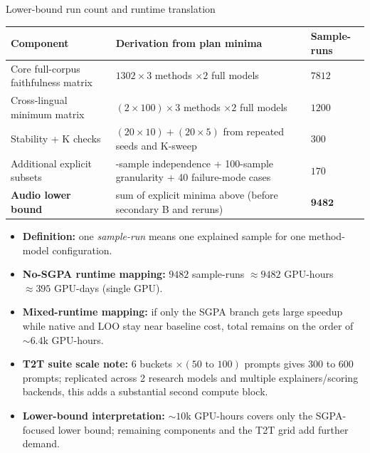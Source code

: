 \documentclass[aspectratio=169]{beamer}
\begin{document}
\begin{frame}{Lower-bound run count and runtime translation}
  \scriptsize
  \begin{tabularx}{\textwidth}{>{\raggedright\arraybackslash}p{3.0cm} >{\raggedright\arraybackslash}X >{\raggedright\arraybackslash}p{2.0cm}}
    \toprule
    \textbf{Component} & \textbf{Derivation from plan minima} & \textbf{Sample-runs} \\
    \midrule
    Core full-corpus faithfulness matrix & \(1302 \times 3\) methods \(\times 2\) full models & \(7812\) \\
    Cross-lingual minimum matrix & \((2 \times 100)\times 3\) methods \(\times 2\) full models & \(1200\) \\
    Stability + K checks & \((20\times10) + (20\times5)\) from repeated seeds and K-sweep & \(300\) \\
    Additional explicit subsets & 30-sample independence + 100-sample granularity + 40 failure-mode cases & \(170\) \\
    \midrule
    \textbf{Audio lower bound} & sum of explicit minima above (before secondary B and reruns) & \(\mathbf{9482}\) \\
    \bottomrule
  \end{tabularx}
\vspace{0.35em}
\begin{itemize}
  \item \textbf{Definition:} one \emph{sample-run} means one explained sample for one method-model configuration.
  \item \textbf{No-SGPA runtime mapping:} \(9482\) sample-runs \(\approx 9482\) GPU-hours \(\approx 395\) GPU-days (single GPU).
  \item \textbf{Mixed-runtime mapping:} if only the SGPA branch gets large speedup while native and LOO stay near baseline cost, total remains on the order of \(\sim 6.4\)k GPU-hours.
  \item \textbf{T2T suite scale note:} \(6\) buckets \(\times (50\text{ to }100)\) prompts gives \(300\) to \(600\) prompts; replicated across 2 research models and multiple explainers/scoring backends, this adds a substantial second compute block.
  \item \textbf{Lower-bound interpretation:} \(\sim 10\)k GPU-hours covers only the SGPA-focused lower bound; remaining components and the T2T grid add further demand.
\end{itemize}
\end{frame}
\end{document}

